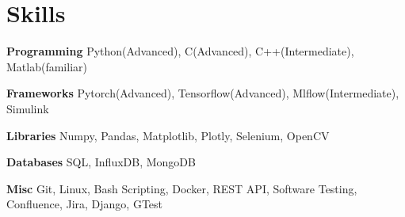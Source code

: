 
\section{Skills}
  \vspace{2pt}
  \resumeSubHeadingListStart
    \small{\item{

    \textbf{\color{MidnightBlue}Programming}{ Python(Advanced), C(Advanced), C++(Intermediate), Matlab(familiar)} \\ \vspace{3pt}

    \textbf{\color{MidnightBlue}Frameworks}{ Pytorch(Advanced), Tensorflow(Advanced), Mlflow(Intermediate)}, Simulink \\ \vspace{3pt}

    \textbf{\color{MidnightBlue}Libraries}{ Numpy, Pandas, Matplotlib, Plotly, Selenium, OpenCV} \\ \vspace{3pt}


    \textbf{\color{MidnightBlue}Databases}{ SQL, InfluxDB, MongoDB} \\ \vspace{3pt}

    \textbf{\color{MidnightBlue}Misc}{ Git, Linux, Bash Scripting, Docker, REST API, Software Testing, Confluence, Jira, Django, GTest} \\ \vspace{3pt}
            
    }}
  \resumeSubHeadingListEnd

